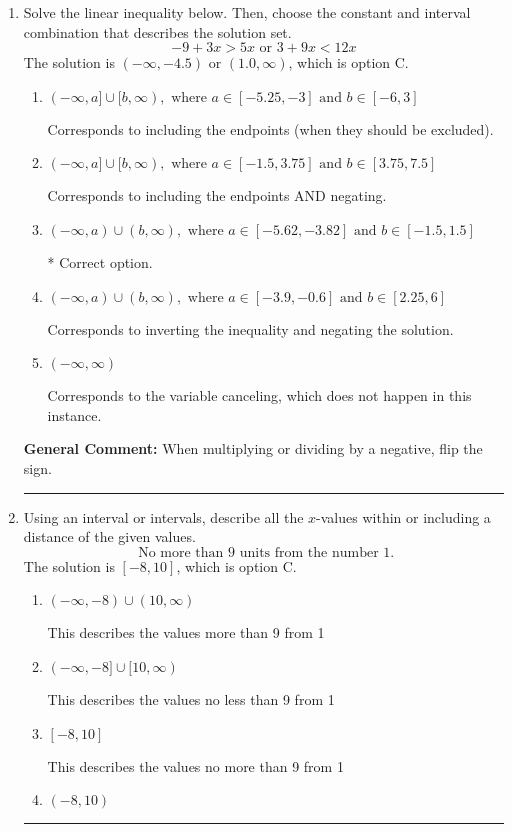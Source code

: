 \documentclass{extbook}[14pt]
\newcommand{\litem}[1]{\item #1

\rule{\textwidth}{0.4pt}}
\begin{document}
\begin{enumerate}
{\textbf{General Comment:} When thinking about this language, it helps to draw a number line and try points.
}
\litem{
Solve the linear inequality below. Then, choose the constant and interval combination that describes the solution set.
\[ -9 + 3 x > 5 x \text{ or } 3 + 9 x < 12 x \]The solution is \( (-\infty, -4.5) \text{ or } (1.0, \infty) \), which is option C.\begin{enumerate}[label=\Alph*.]
\item \( (-\infty, a] \cup [b, \infty), \text{ where } a \in [-5.25, -3] \text{ and } b \in [-6, 3] \)

Corresponds to including the endpoints (when they should be excluded).
\item \( (-\infty, a] \cup [b, \infty), \text{ where } a \in [-1.5, 3.75] \text{ and } b \in [3.75, 7.5] \)

Corresponds to including the endpoints AND negating.
\item \( (-\infty, a) \cup (b, \infty), \text{ where } a \in [-5.62, -3.82] \text{ and } b \in [-1.5, 1.5] \)

 * Correct option.
\item \( (-\infty, a) \cup (b, \infty), \text{ where } a \in [-3.9, -0.6] \text{ and } b \in [2.25, 6] \)

Corresponds to inverting the inequality and negating the solution.
\item \( (-\infty, \infty) \)

Corresponds to the variable canceling, which does not happen in this instance.
\end{enumerate}

\textbf{General Comment:} When multiplying or dividing by a negative, flip the sign.
}
\litem{
Using an interval or intervals, describe all the $x$-values within or including a distance of the given values.
\[ \text{ No more than } 9 \text{ units from the number } 1. \]The solution is \( [-8, 10] \), which is option C.\begin{enumerate}[label=\Alph*.]
\item \( (-\infty, -8) \cup (10, \infty) \)

This describes the values more than 9 from 1
\item \( (-\infty, -8] \cup [10, \infty) \)

This describes the values no less than 9 from 1
\item \( [-8, 10] \)

This describes the values no more than 9 from 1
\item \( (-8, 10) \)


\end{enumerate}}
\end{enumerate}
\end{document}
